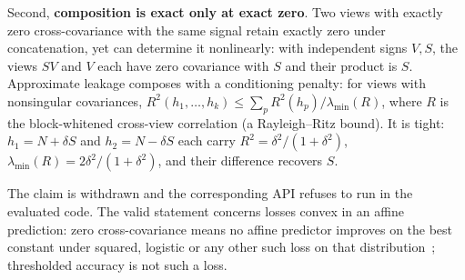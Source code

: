 Second, \textbf{composition is exact only at exact zero}. Two views with exactly zero cross-covariance
with the same signal retain exactly zero under concatenation, yet can determine it nonlinearly: with
independent signs $V,S$, the views $SV$ and $V$ each have zero covariance with $S$ and their product is
$S$. Approximate leakage composes with a conditioning penalty: for views with nonsingular covariances,
$R^2(h_1,\dots,h_k)\le\sum_p R^2(h_p)/\lambda_{\min}(R)$, where $R$ is the block-whitened cross-view
correlation (a Rayleigh--Ritz bound). It is tight: $h_1=N+\delta S$ and $h_2=N-\delta S$ each carry
$R^2=\delta^2/(1+\delta^2)$, $\lambda_{\min}(R)=2\delta^2/(1+\delta^2)$, and their difference recovers $S$.

The claim is withdrawn and the corresponding API refuses to run in the evaluated code. The valid
statement concerns losses convex in an affine prediction: zero cross-covariance means no affine predictor
improves on the best constant under squared, logistic or any other such loss on that
distribution~\cite{belrose2023leace}; thresholded accuracy is not such a loss.
